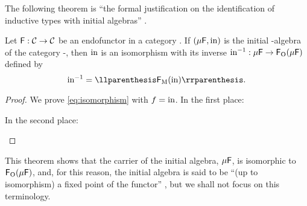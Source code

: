 The following theorem is ``the formal justification on the
identification of inductive types with initial algebras''
\parencite[17]{vene-2000}.

\begin{theorem}[Lambek]
  \label{the:lambek}


  Let $\mathsf{F}: \mathcal{C} \to \mathcal{C}$ be an endofunctor in a category
  . If $(\mu\mathsf{F},\operatorname{in})$ is the initial -algebra of
  the category -\alg, then $\operatorname{in}$ is an isomorphism with its
  inverse $\operatorname{in}^{-1}: \mu\mathsf{F} \to \mathsf{F}_{\operatorname{O}}(\mu\mathsf{F})$ defined
  by
  \begin{equation}
    \label{eq:lambek}
    \inmo^{-1} = \cata{\funcM{F}(\inmo)}
    \text{.}
  \end{equation}

  \begin{proof}

    We prove \eqref{eq:isomorphism} with $f = \operatorname{in}$. In the first
    place:
    \begin{steps}
        \eqby{\eqref{eq:lambek}}
      \stepm{\cata\inmo}
        \eqby{\eqref{eq:cata-refl}}
    \end{steps}
    In the second place:
    \begin{steps}
        \eqby{\eqref{eq:lambek}}
    \end{steps}

  \end{proof}

\end{theorem}

This theorem shows that the carrier of the initial algebra,
$\mu\mathsf{F}$, is isomorphic to $\mathsf{F}_{\operatorname{O}}(\mu\mathsf{F})$, and, for
this reason, the initial algebra is said to be ``(up to isomorphism) a
fixed point of the functor'' \parencite[18]{vene-2000}, but we shall
not focus on this terminology.

